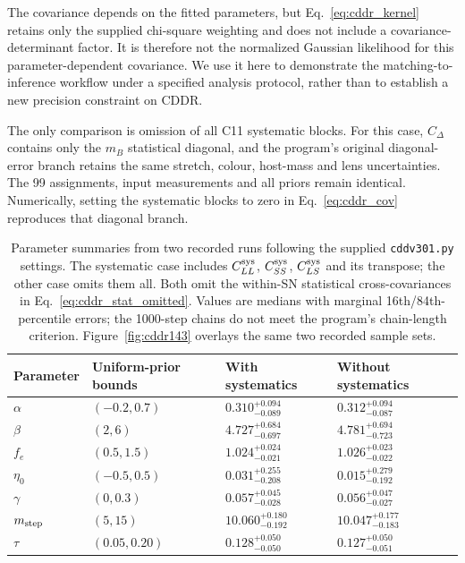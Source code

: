 The covariance depends on the fitted parameters, but Eq.~\ref{eq:cddr_kernel} retains only the supplied chi-square weighting and does not include a covariance-determinant factor. It is therefore not the normalized Gaussian likelihood for this parameter-dependent covariance. We use it here to demonstrate the matching-to-inference workflow under a specified analysis protocol, rather than to establish a new precision constraint on CDDR.

The only comparison is omission of all C11 systematic blocks. For this case, $C_\Delta$ contains only the $m_B$ statistical diagonal, and the program's original diagonal-error branch retains the same stretch, colour, host-mass and lens uncertainties. The 99 assignments, input measurements and all priors remain identical. Numerically, setting the systematic blocks to zero in Eq.~\ref{eq:cddr_cov} reproduces that diagonal branch.

\begin{table}[htbp]
\centering\small
\caption{Parameter summaries from two recorded runs following the supplied \texttt{cddv301.py} settings. The systematic case includes $C_{LL}^{\rm sys}$, $C_{SS}^{\rm sys}$, $C_{LS}^{\rm sys}$ and its transpose; the other case omits them all. Both omit the within-SN statistical cross-covariances in Eq.~\ref{eq:cddr_stat_omitted}. Values are medians with marginal 16th/84th-percentile errors; the 1000-step chains do not meet the program's chain-length criterion. Figure~\ref{fig:cddr143} overlays the same two recorded sample sets.}\label{tab:cddr143}
\begin{tabular}{llll}\toprule
Parameter & Uniform-prior bounds & With systematics & Without systematics\\\midrule
$\alpha$ & $(-0.2,0.7)$ & $0.310^{+0.094}_{-0.089}$ & $0.312^{+0.094}_{-0.087}$ \\
$\beta$ & $(2,6)$ & $4.727^{+0.684}_{-0.697}$ & $4.781^{+0.694}_{-0.723}$ \\
$f_e$ & $(0.5,1.5)$ & $1.024^{+0.024}_{-0.021}$ & $1.026^{+0.023}_{-0.022}$ \\
$\eta_0$ & $(-0.5,0.5)$ & $0.031^{+0.255}_{-0.208}$ & $0.015^{+0.279}_{-0.192}$ \\
$\gamma$ & $(0,0.3)$ & $0.057^{+0.045}_{-0.028}$ & $0.056^{+0.047}_{-0.027}$ \\
$m_{\rm step}$ & $(5,15)$ & $10.060^{+0.180}_{-0.192}$ & $10.047^{+0.177}_{-0.183}$ \\
$\tau$ & $(0.05,0.20)$ & $0.128^{+0.050}_{-0.050}$ & $0.127^{+0.050}_{-0.051}$ \\
\bottomrule\end{tabular}
\end{table}


